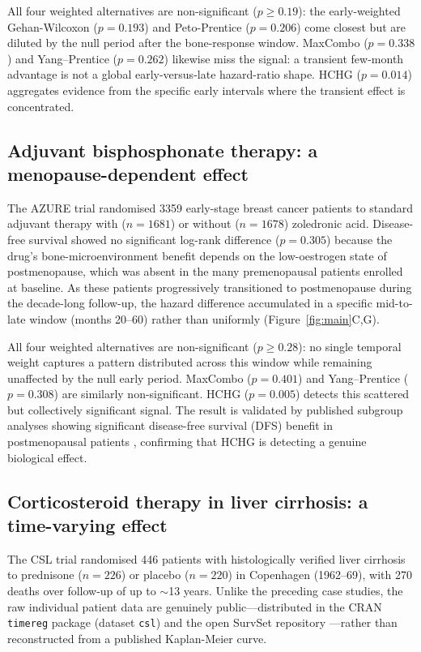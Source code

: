 \documentclass[unnumsec,webpdf,contemporary,large]{oup-authoring-template}
\begin{document}
All four weighted alternatives are non-significant ($p \geq 0.19$):
the early-weighted Gehan-Wilcoxon ($p = 0.193$) and Peto-Prentice
($p = 0.206$) come closest but are diluted by the null period after
the bone-response window. MaxCombo ($p = 0.338$) and Yang--Prentice
($p = 0.262$) likewise miss the signal: a transient few-month advantage
is not a global early-versus-late hazard-ratio shape. HCHG ($p = 0.014$) aggregates evidence from the specific early intervals
where the transient effect is concentrated.

\subsection*{Adjuvant bisphosphonate therapy: a menopause-dependent effect}

The AZURE trial \citep{coleman2011,coleman2014} randomised 3359 early-stage
breast cancer patients to standard adjuvant therapy with ($n=1681$) or
without ($n=1678$) zoledronic acid. Disease-free survival showed no
significant log-rank difference ($p = 0.305$) because the drug's
bone-microenvironment benefit depends on the low-oestrogen state of
postmenopause, which was absent in the many premenopausal patients
enrolled at baseline. As these patients progressively transitioned to
postmenopause during the decade-long follow-up, the hazard difference
accumulated in a specific mid-to-late window (months 20--60) rather than
uniformly (Figure~\ref{fig:main}C,G).

All four weighted alternatives are non-significant ($p \geq 0.28$):
no single temporal weight captures a pattern distributed across this
window while remaining unaffected by the null early period. MaxCombo
($p = 0.401$) and Yang--Prentice ($p = 0.308$) are similarly
non-significant. HCHG
($p = 0.005$) detects this scattered but collectively significant signal.
The result is validated by published subgroup analyses showing significant disease-free survival (DFS) benefit in postmenopausal patients \citep{coleman2011,coleman2014},
confirming that HCHG is detecting a genuine biological effect.

\subsection*{Corticosteroid therapy in liver cirrhosis: a time-varying effect}

The CSL trial \citep{csl_data} randomised 446 patients with histologically
verified liver cirrhosis to prednisone ($n=226$) or placebo ($n=220$) in
Copenhagen (1962--69), with 270 deaths over follow-up of up to
$\sim$13 years. Unlike the preceding case studies, the raw individual
patient data are genuinely public---distributed in the CRAN \texttt{timereg}
package (dataset \texttt{csl}) and the open SurvSet repository
\citep{survset2022}---rather than reconstructed from a published
Kaplan-Meier curve.
\end{document}

